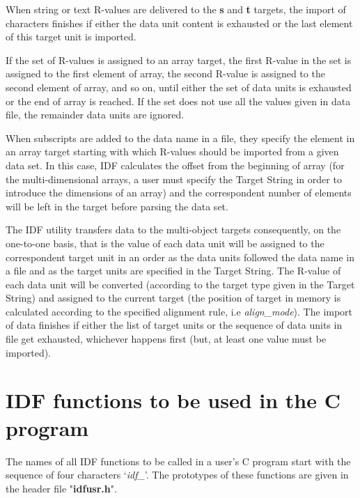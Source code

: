When string or text R-values are delivered to the {\bf s} and {\bf t}
targets, the import of characters finishes if
either the data unit content is exhausted or the last element
of this target unit is imported.

If the set of R-values is assigned to an array target,
the first R-value in the set is assigned to the first element
of array, the second R-value is assigned to the second element
of array, and so on, until either the set of data units
is exhausted or the end of array is reached. 
If the set does not use all the values given in data file,
the remainder data units are ignored.

When  subscripts are added to the data name in a file,
they specify the element in an array target starting with
which  R-values should be imported from a given data set.
In this case, IDF calculates the offset
from the beginning of array
(for the multi-dimensional arrays, a user must specify the Target String
in order to introduce the dimensions of an array)
and the correspondent number of elements will be left in the target
before parsing the data set.
 
The IDF utility transfers data to the multi-object targets consequently,
on the one-to-one basis, that is the value of each data unit
will be assigned to the correspondent target unit
in an order as the data units followed the data name in a file 
and as the target units are specified in the Target String.
The R-value of each data unit will be converted (according to the
target type given in the Target String) 
and assigned to the current target
(the position of target in memory is calculated
according to the specified alignment rule, i.e {\it align\_mode}).
The import of data finishes if either the list of target units 
or the sequence of data units in file get exhausted,
whichever happens first (but, at least one value must be imported).

\section{IDF functions to be used in the C program}

The names of all IDF functions to be called in a user's C program
start with the sequence of four characters `{\it idf\_}'.
The prototypes of these functions are given in the
header file "{\bf idfusr.h}". 

